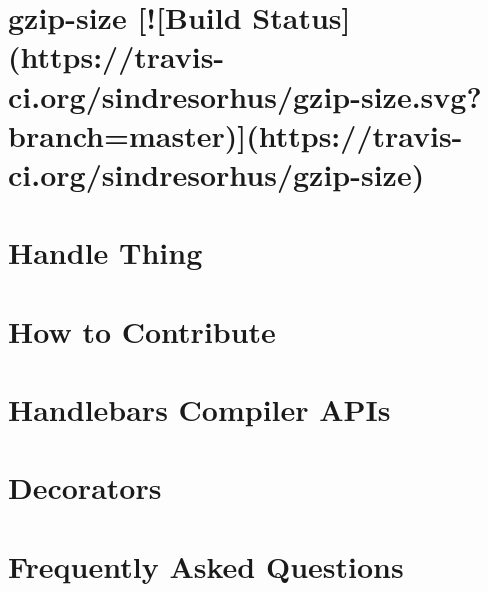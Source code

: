 \documentclass[twoside]{book}
\newcommand{\+}{\discretionary{\mbox{\scriptsize$\hookleftarrow$}}{}{}}
\begin{document}
\chapter{gzip-\/size \mbox{[}!\mbox{[}Build Status\mbox{]}(https\+://travis-\/ci.org/sindresorhus/gzip-\/size.svg?branch=master)\mbox{]}(https\+://travis-\/ci.org/sindresorhus/gzip-\/size)}
\label{md__c_1_workspace_demo_src_main_script_node_modules_gzip-size_readme}

\chapter{Handle Thing}
\label{md__c_1_workspace_demo_src_main_script_node_modules_handle-thing__r_e_a_d_m_e}

\chapter{How to Contribute}
\label{md__c_1_workspace_demo_src_main_script_node_modules_handlebars__c_o_n_t_r_i_b_u_t_i_n_g}

\chapter{Handlebars Compiler A\+P\+Is}
\label{md__c_1_workspace_demo_src_main_script_node_modules_handlebars_docs_compiler-api}

\chapter{Decorators}
\label{md__c_1_workspace_demo_src_main_script_node_modules_handlebars_docs_decorators-api}

\chapter{Frequently Asked Questions}
\label{md__c_1_workspace_demo_src_main_script_node_modules_handlebars__f_a_q}

\end{document}
